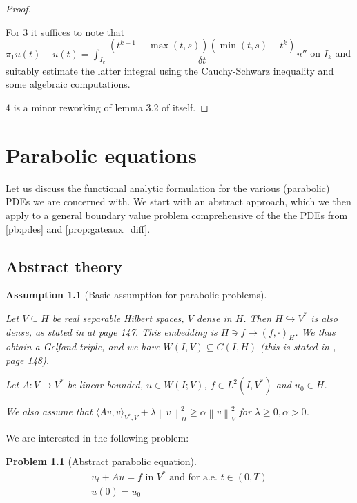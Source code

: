 \documentclass[english,a4paper,10pt,oneside]{scrbook}	%
\theoremstyle{break}
\newtheorem{ass}[equation]{Assumption}
\newtheorem{pb}[equation]{Problem}
\newenvironment{mproof}[1][\proofname]{%
  \begin{proof}[#1]$ $\par\nobreak\ignorespaces
}{%
  \end{proof}
}
\renewcommand*{\proofname}{Proof}
\theoremstyle{remark}
\newcommand{\ds}{\displaystyle}
\newcommand{\norm}[1]{\left\lVert#1\right\rVert}
\newcommand{\HN}[1]{\norm{#1}_{H}}
\newcommand{\VN}[1]{\norm{#1}_{V}}
\begin{document}
\begin{appendices}
\begin{mproof}
For $3$ it suffices to note that $\pi_1 u(t) - u(t) = \ds \int_{I_k} \dfrac{(t^{k+1}-\max(t,s))(\min(t, s)-t^k)}{\delta t}u''$ on $I_k$ and suitably estimate the latter integral using the Cauchy-Schwarz inequality and some algebraic computations.

$4$ is a minor reworking of lemma 3.2 of \cite{lshou} itself.
\end{mproof}

\chapter{Parabolic equations}
\label{chap:parab_eq}

Let us discuss the functional analytic formulation for the various (parabolic) PDEs we are concerned with. We start with an abstract approach, which we then apply to a general boundary value problem comprehensive of the the PDEs from \cref{pb:pdes} and \cref{prop:gateaux_diff}.

\section{Abstract theory}

\begin{ass}[Basic assumption for parabolic problems]
\label{ass:basic_par}

Let $V\subseteq H$ be real separable Hilbert spaces, $V$ dense in $H$. Then $H\hookrightarrow V^*$ is also dense, as stated in \cite{trol} at page 147. This embedding is $H \ni f \mapsto (f, \cdot )_H$. We thus obtain a Gelfand triple, and we have $W(I,V)\subseteq C(I,H)$ (this is stated in \cite{trol}, page 148).

Let $A:V\rightarrow V^* $ be linear bounded, $u \in W(I;V)$, $f \in L^2(I,V^*)$ and $u_0 \in H$.

We also assume that $\langle Av, v \rangle_{V^*,V}+ \lambda \HN{v}^2\geq \alpha \VN{v}^2$ for $\lambda \geq 0, \alpha >0$.
\end{ass}

We are interested in the following problem:

\begin{pb}[Abstract parabolic equation]
\label{eqn:general_parabolic}
\begin{align}
	u_t+Au=f \text{ in }V^* \text{ and for a.e. } t \in (0,T)\\
	u(0)=u_0
\end{align}
\end{pb}


\end{appendices}
\end{document}
